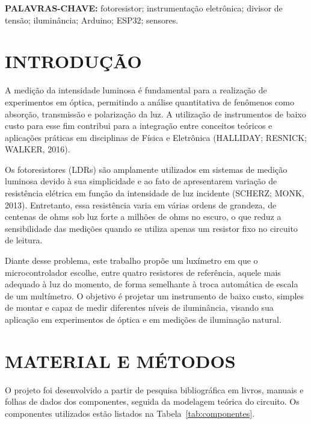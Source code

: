 \documentclass[11pt,a4paper]{article}
\begin{document}
\vspace{4pt}
\noindent\textbf{PALAVRAS-CHAVE:} fotoresistor; instrumentação eletrônica; divisor de tensão; iluminância; Arduino; ESP32; sensores.

\section*{INTRODUÇÃO}

A medição da intensidade luminosa é fundamental para a realização de experimentos em óptica, permitindo a análise quantitativa de fenômenos como absorção, transmissão e polarização da luz. A utilização de instrumentos de baixo custo para esse fim contribui para a integração entre conceitos teóricos e aplicações práticas em disciplinas de Física e Eletrônica (HALLIDAY; RESNICK; WALKER, 2016).

Os fotoresistores (LDRs) são amplamente utilizados em sistemas de medição luminosa devido à sua simplicidade e ao fato de apresentarem variação de resistência elétrica em função da intensidade de luz incidente (SCHERZ; MONK, 2013). Entretanto, essa resistência varia em várias ordens de grandeza, de centenas de ohms sob luz forte a milhões de ohms no escuro, o que reduz a sensibilidade das medições quando se utiliza apenas um resistor fixo no circuito de leitura.

Diante desse problema, este trabalho propõe um luxímetro em que o microcontrolador escolhe, entre quatro resistores de referência, aquele mais adequado à luz do momento, de forma semelhante à troca automática de escala de um multímetro. O objetivo é projetar um instrumento de baixo custo, simples de montar e capaz de medir diferentes níveis de iluminância, visando sua aplicação em experimentos de óptica e em medições de iluminação natural.

\section*{MATERIAL E MÉTODOS}

O projeto foi desenvolvido a partir de pesquisa bibliográfica em livros, manuais e folhas de dados dos componentes, seguida da modelagem teórica do circuito. Os componentes utilizados estão listados na Tabela~\ref{tab:componentes}.
\end{document}
